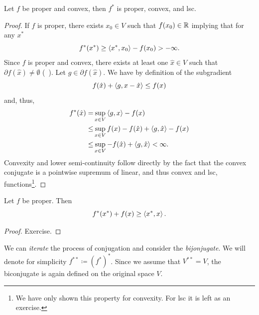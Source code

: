 \begin{lemma}
    Let $f$ be proper and convex, then $f^*$ is proper, convex, and lsc.
\end{lemma}
\begin{proof}
    If $f$ is proper, there exists $x_0\in V$ such that $f(x_0)\in \mathbb{R}$ implying that for any $x^*$
    \begin{equation}
        f^*(x^*)\geq \left\langle x^* , x_0\right\rangle - f(x_0)> -\infty.
    \end{equation}
    Since $f$ is proper and convex, there exists at least one $\hat x\in V$ such that $\partial f(\hat x) \neq \emptyset$ (\cf~\cite[Corollary 3.19]{beck2017first}). Let $g\in \partial f(\hat x)$. We have by definition of the subgradient
    \begin{equation}
        f(\hat x) + \left\langle g , x-\hat x\right\rangle\leq f(x)
    \end{equation}
    and, thus,
    \begin{equation}
        \begin{aligned}
            f^*(\hat x)
            =& \sup_{x\in V}\left\langle g , x\right\rangle - f(x)\\
            \leq& \sup_{x\in V}f(x) - f(\hat x) + \left\langle g , \hat x\right\rangle - f(x)\\
            \leq& \sup_{x\in V}- f(\hat x) + \left\langle g , \hat x\right\rangle <\infty.
        \end{aligned}
    \end{equation}
    Convexity and lower semi-continuity follow directly by the fact that the convex conjugate is a pointwise supremum of linear, and thus convex and lsc, functions\footnote{We have only shown this property for convexity. For lsc it is left as an exercise.}. 
\end{proof}

\begin{lemma}
    Let $f$ be proper. Then
    \begin{equation}
        f^*(x^*) + f(x)\geq \left\langle x^* , x\right\rangle.
    \end{equation}
\end{lemma}
\begin{proof}
    Exercise.
\end{proof}

We can \emph{iterate} the process of conjugation and consider the \emph{bijonjugate}. We will denote for simplicity $f^{**} \coloneq (f^*)^*$. Since we assume that $V^{**}=V$, the biconjugate is again defined on the original space $V$.

